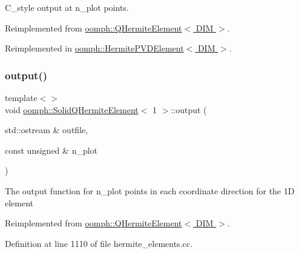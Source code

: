 C\+\_\+style output at n\+\_\+plot points. 



Reimplemented from \hyperlink{classoomph_1_1QHermiteElement_a12a4346480e45d82cbfca1f324cd4878}{oomph\+::\+Q\+Hermite\+Element$<$ D\+I\+M $>$}.



Reimplemented in \hyperlink{classoomph_1_1HermitePVDElement_a4a8edf00d8c8b4fe61676fead8413ab9}{oomph\+::\+Hermite\+P\+V\+D\+Element$<$ D\+I\+M $>$}.

\mbox{\label{classoomph_1_1SolidQHermiteElement_adef773329622efbbe113755da62a9cae}} 
\subsubsection{\texorpdfstring{output()}{output()}\hspace{0.1cm}{\footnotesize\ttfamily [5/8]}}
{\footnotesize\ttfamily template$<$$>$ \\
void \hyperlink{classoomph_1_1SolidQHermiteElement}{oomph\+::\+Solid\+Q\+Hermite\+Element}$<$ 1 $>$\+::output (\begin{DoxyParamCaption}\item[{std\+::ostream \&}]{outfile,  }\item[{const unsigned \&}]{n\+\_\+plot }\end{DoxyParamCaption})\hspace{0.3cm}{\ttfamily [virtual]}}

The output function for n\+\_\+plot points in each coordinate direction for the 1D element 

Reimplemented from \hyperlink{classoomph_1_1QHermiteElement_a8053b3b58ea769a5e7be72982d594c0d}{oomph\+::\+Q\+Hermite\+Element$<$ D\+I\+M $>$}.



Definition at line 1110 of file hermite\+\_\+elements.\+cc.

\mbox{\label{classoomph_1_1SolidQHermiteElement_adb8a603a0f50a7944be7af4a1cd0abc5}} 
